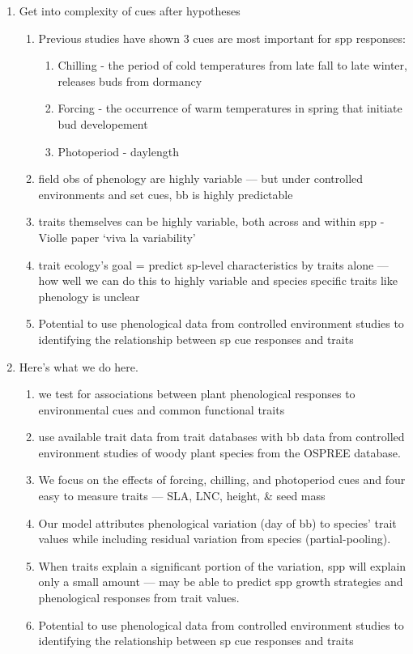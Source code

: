 \documentclass{article}
\begin{document}
\begin{enumerate}
\item Get into complexity of cues after hypotheses
\begin{enumerate}
\item Previous studies have shown 3 cues are most important for spp responses:
\begin{enumerate}
\item Chilling - the period of cold temperatures from late fall to late winter, releases buds from dormancy
\item Forcing - the occurrence of warm temperatures in spring that initiate bud developement 
\item Photoperiod - daylength
\end{enumerate}
\item field obs of phenology are highly variable — but under controlled environments and set cues, bb is highly predictable
\item traits themselves can be highly variable, both across and within spp - Violle paper ‘viva la variability’
\item trait ecology’s goal = predict sp-level characteristics by traits alone — how well we can do this to highly variable and species specific traits like phenology is unclear
\item Potential to use phenological data from controlled environment studies to identifying the relationship between sp cue responses and traits


\end{enumerate}

\item Here's what we do here.
\begin{enumerate}
\item we test for associations between plant phenological responses to environmental cues and common functional traits 
\item use available trait data from trait databases with bb data from controlled environment studies of woody plant species from the OSPREE database.
\item We focus on the effects of forcing, chilling, and photoperiod cues and four easy to measure traits — SLA, LNC, height, \& seed mass
\item Our model attributes phenological variation (day of bb) to species’ trait values while including residual variation from species (partial-pooling).
\item When traits explain a significant portion of the variation, spp will explain only a small amount — may be able to predict spp growth strategies and phenological responses from trait values.
\item Potential to use phenological data from controlled environment studies to identifying the relationship between sp cue responses and traits
\end{enumerate}


\end{enumerate}
\end{document}

